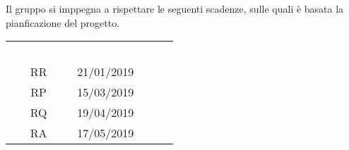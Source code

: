 Il gruppo \gruppo\space si imppegna a rispettare le seguenti scadenze, sulle quali
è basata la pianficazione del progetto.

\renewcommand{\arraystretch}{1}
\begin{center}
    \begin{tabular}{| c| c | C{4cm} | c | c |}
        \hline
        \textcolor{white}{\textbf{Revisione}} & \textcolor{white}{\textbf{Scadenza}}\\
        RR & 21/01/2019 \\
        RP & 15/03/2019 \\
        RQ & 19/04/2019 \\
        RA & 17/05/2019 \\
        \hline
    \end{tabular}
\end{center}

   